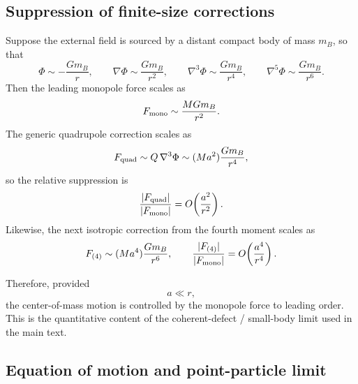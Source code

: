 \documentclass[11pt]{article}
\newcommand{\PhiN}{\Phi}
\begin{document}
\subsection{Suppression of finite-size corrections}
\label{app:moments-suppression}

Suppose the external field is sourced by a distant compact body of mass \(m_B\), so that
\begin{equation}
\PhiN\sim -\frac{Gm_B}{r},
\qquad
\nabla\PhiN\sim \frac{Gm_B}{r^2},
\qquad
\nabla^3\PhiN\sim \frac{Gm_B}{r^4},
\qquad
\nabla^5\PhiN\sim \frac{Gm_B}{r^6}.
\label{eq:app-potential-scaling}
\end{equation}
Then the leading monopole force scales as
\begin{equation}
F_{\rm mono}\sim \frac{MGm_B}{r^2}.
\label{eq:app-Fmono-scaling}
\end{equation}
The generic quadrupole correction scales as
\begin{equation}
F_{\rm quad}\sim Q\,\nabla^3\PhiN
\sim
(Ma^2)\frac{Gm_B}{r^4},
\label{eq:app-Fquad-scaling}
\end{equation}
so the relative suppression is
\begin{equation}
\frac{|F_{\rm quad}|}{|F_{\rm mono}|}
=
O\!\left(\frac{a^2}{r^2}\right).
\label{eq:app-quad-suppression}
\end{equation}
Likewise, the next isotropic correction from the fourth moment scales as
\begin{equation}
F_{(4)}
\sim
(Ma^4)\frac{Gm_B}{r^6},
\qquad
\frac{|F_{(4)}|}{|F_{\rm mono}|}
=
O\!\left(\frac{a^4}{r^4}\right).
\label{eq:app-fourth-suppression}
\end{equation}

Therefore, provided
\begin{equation}
a\ll r,
\label{eq:app-small-body}
\end{equation}
the center-of-mass motion is controlled by the monopole force to leading order. This is
the quantitative content of the coherent-defect / small-body limit used in the main text.

\subsection{Equation of motion and point-particle limit}
\label{app:moments-eom}
\end{document}
